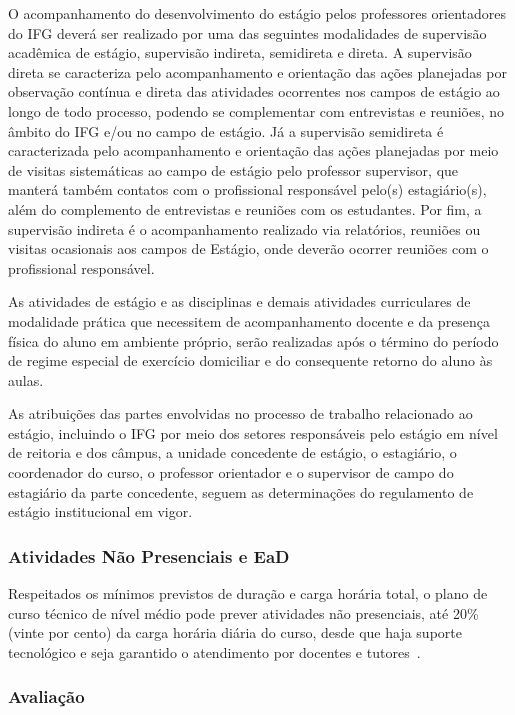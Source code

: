 \documentclass[11pt,fleqn]{book} %
\begin{document}
O acompanhamento do desenvolvimento do estágio pelos professores orientadores do IFG deverá ser realizado por uma das seguintes modalidades de supervisão acadêmica de estágio, supervisão indireta, semidireta e direta. 
A supervisão direta se caracteriza pelo acompanhamento e orientação das ações planejadas por observação contínua e direta das atividades ocorrentes nos campos de estágio ao longo de todo processo, podendo se complementar com entrevistas e reuniões, no âmbito do IFG e/ou no campo de estágio. 
Já a supervisão semidireta é caracterizada pelo acompanhamento e orientação das ações planejadas por meio de visitas sistemáticas ao campo de estágio pelo professor supervisor, que manterá também contatos com o profissional responsável pelo(s) estagiário(s), além do complemento de entrevistas e reuniões com os estudantes. 
Por fim, a supervisão indireta é o acompanhamento realizado via relatórios, reuniões ou visitas ocasionais aos campos de Estágio, onde deverão ocorrer reuniões com o profissional responsável.  

As atividades de estágio e as disciplinas e demais atividades curriculares de modalidade prática que necessitem de acompanhamento docente e da presença física do aluno em ambiente próprio, serão realizadas após o término do período de regime especial de exercício domiciliar e do consequente retorno do aluno às aulas.

As atribuições das partes envolvidas no processo de trabalho relacionado ao estágio, incluindo o IFG por meio dos setores responsáveis pelo estágio em nível de reitoria e dos câmpus, a unidade concedente de estágio, o estagiário, o coordenador do curso, o professor orientador e o supervisor de campo do estagiário da parte concedente, seguem as determinações do regulamento de estágio institucional em vigor.

\subsubsection{Atividades Não Presenciais e EaD}
\indent

Respeitados os mínimos previstos de duração e carga horária total, o plano de curso técnico de nível médio pode prever atividades não presenciais, até 20\% (vinte por cento) da carga horária diária do curso, desde que haja suporte tecnológico e seja garantido o atendimento por docentes e tutores~\cite{Resolucao06De2012}.

\subsubsection{Avaliação}
\end{document}

